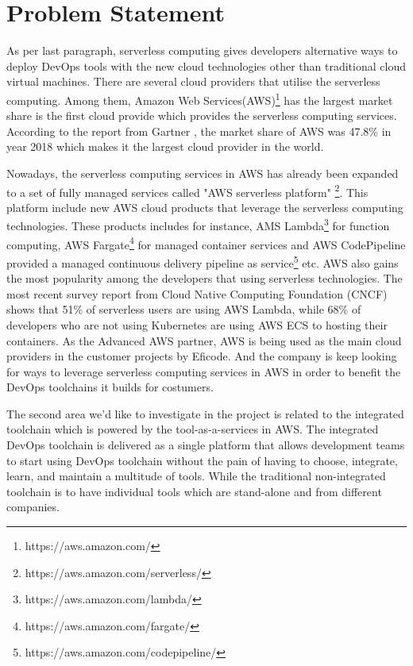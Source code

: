 \section{Problem Statement}
As per last paragraph, serverless computing gives developers alternative ways to deploy DevOps tools with the new cloud technologies other than traditional cloud virtual machines. There are several cloud providers that utilise the serverless computing. Among them, Amazon Web Services(AWS)\footnote{https://aws.amazon.com/} has the largest market share is the first cloud provide which provides the serverless computing services. According to the report from Gartner \cite{GartnerS47:online}, the market share of AWS was 47.8\% in year 2018 which makes it the largest cloud provider in the world.
\par
Nowadays, the serverless computing services in AWS has already been expanded to a set of fully managed services called "AWS serverless platform" \footnote{https://aws.amazon.com/serverless/}. This platform include new AWS cloud products that leverage the serverless computing technologies. These products includes for instance, AMS Lambda\footnote{https://aws.amazon.com/lambda/} for function computing, AWS Fargate\footnote{https://aws.amazon.com/fargate/} for managed container services and AWS CodePipeline provided a managed continuous delivery pipeline as service\footnote{https://aws.amazon.com/codepipeline/} etc. 
AWS also gains the most popularity among the developers that using serverless technologies. The most recent survey report \cite{cncf2020} from Cloud Native Computing Foundation (CNCF) shows that 51\% of serverless users are using AWS Lambda, while 68\% of developers who are not using Kubernetes are using AWS ECS to hosting their containers.
As the Advanced AWS partner, AWS is being used as the main cloud providers in the customer projects by Eficode. And the company is keep looking for ways to leverage serverless computing services in AWS in order to benefit the DevOps toolchains it builds for costumers.
\par
The second area we'd like to investigate in the project is related to the integrated toolchain which is powered by the tool-as-a-services in AWS.
The integrated DevOps toolchain is delivered as a single platform that allows development teams to start using DevOps toolchain without the pain of having to choose, integrate, learn, and maintain a multitude of tools. While the traditional non-integrated toolchain is to have individual tools which are stand-alone and from different companies.
